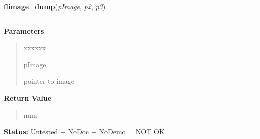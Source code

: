 \hspace{.8\funcindent}\begin{boxedminipage}{\funcwidth}

    \raggedright \textbf{flimage\_dump}(\textit{pImage}, \textit{p2}, \textit{p3})

    \vspace{-1.5ex}

    \rule{\textwidth}{0.5\fboxrule}
\setlength{\parskip}{2ex}
\setlength{\parskip}{1ex}
      \textbf{Parameters}
      \vspace{-1ex}

      \begin{quote}
        \begin{Ventry}{xxxxxx}

          \item[pImage]

          pointer to image

        \end{Ventry}

      \end{quote}

      \textbf{Return Value}
    \vspace{-1ex}

      \begin{quote}
      num

      \end{quote}

\textbf{Status:} Untested + NoDoc + NoDemo = NOT OK



    \end{boxedminipage}

    \label{xformslib:flflimage:flimage_close}

    \vspace{0.5ex}

